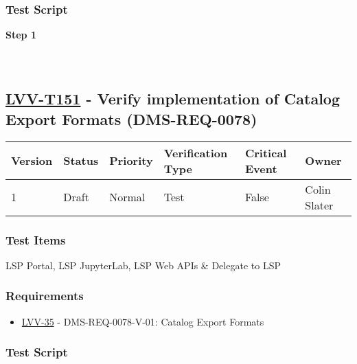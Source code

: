 \hypertarget{test-script-127}{%
\subsubsection{Test Script}\label{test-script-127}}

\textbf{Step 1}\\
~\\
~\\

\hypertarget{lvv-t151---verify-implementation-of-catalog-export-formats-dms-req-0078}{%
\subsection{\texorpdfstring{\href{https://jira.lsstcorp.org/secure/Tests.jspa\#/testCase/LVV-T151}{LVV-T151}
- Verify implementation of Catalog Export Formats
(DMS-REQ-0078)}{LVV-T151 - Verify implementation of Catalog Export Formats (DMS-REQ-0078)}}\label{lvv-t151---verify-implementation-of-catalog-export-formats-dms-req-0078}}

\begin{longtable}[]{@{}llllll@{}}
\toprule
Version & Status & Priority & Verification Type & Critical Event &
Owner\tabularnewline
\midrule
\endhead
1 & Draft & Normal & Test & False & Colin Slater\tabularnewline
\bottomrule
\end{longtable}

\hypertarget{test-items-127}{%
\subsubsection{Test Items}\label{test-items-127}}

LSP Portal, LSP JupyterLab, LSP Web APIs \& Delegate to LSP

\hypertarget{requirements-128}{%
\subsubsection{Requirements}\label{requirements-128}}

\begin{itemize}
\tightlist
\item
  \href{https://jira.lsstcorp.org/browse/LVV-35}{LVV-35} -
  DMS-REQ-0078-V-01: Catalog Export Formats
\end{itemize}

\hypertarget{test-script-128}{%
\subsubsection{Test Script}\label{test-script-128}}

